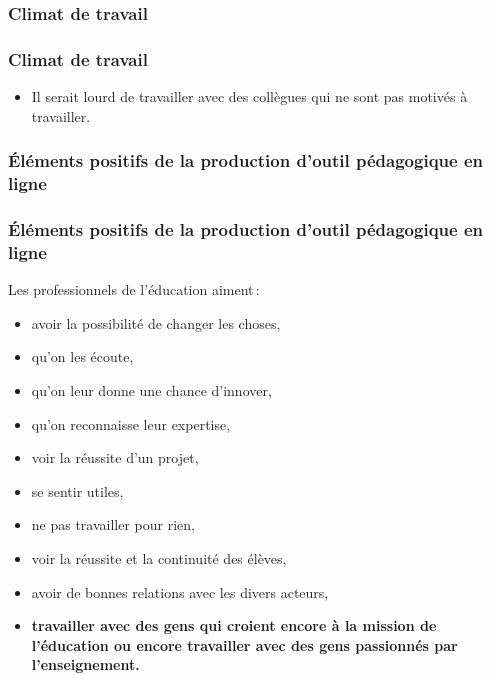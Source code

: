 					\subsubsection{Climat de travail} 
						\begin{frame}[allowframebreaks]
						\frametitle{Climat de travail}
                        			
                        			\begin{itemize}
                        			\item Il serait lourd de travailler avec des collègues qui ne sont pas motivés à travailler.
                        				
						\end{itemize}
						\end{frame}		
						
					\subsubsection{Éléments positifs de la production d’outil pédagogique en ligne} 
						\begin{frame}[allowframebreaks]
						\frametitle{Éléments positifs de la production d’outil pédagogique en ligne}
                        			Les professionnels de l'éducation aiment\,: 
                        			\begin{itemize}
                        			\item avoir la possibilité de changer les choses,
                        			\item qu’on les écoute,
                        			\item qu’on leur donne une chance d’innover, 
                        			\item qu’on reconnaisse leur expertise, 
                        			\item voir la réussite d’un projet, 
                        			\item se sentir utiles, 
                        			\item ne pas travailler pour rien, 
                        			\item voir la réussite et la continuité des élèves,
                        			\item avoir de bonnes relations avec les divers acteurs,
                        			\item \textbf{travailler avec des gens qui croient encore à la mission de l’éducation ou encore travailler avec des gens passionnés par l’enseignement.}
                        				
						\end{itemize}
						\end{frame}		
						
